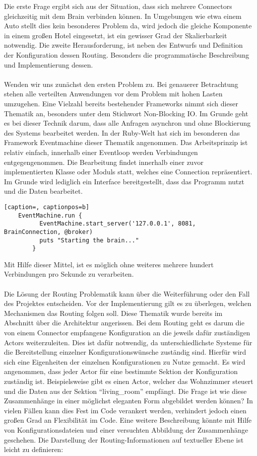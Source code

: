 Die erste Frage ergibt sich aus der Situation, dass sich mehrere Connectors gleichzeitig mit dem Brain verbinden können. In Umgebungen wie etwa einem Auto stellt dies kein besonderes Problem da, wird jedoch die gleiche Komponente in einem großen Hotel eingesetzt, ist ein gewisser Grad der Skalierbarkeit notwendig. Die zweite Herausforderung, ist neben des Entwurfs und Definition der Konfiguration dessen Routing. Besonders die programmatische Beschreibung und Implementierung dessen. 
\\\\
Wenden wir uns zunächst den ersten Problem zu. Bei genauerer Betrachtung stehen alle verteilten Anwendungen vor dem Problem mit hohen Lasten umzugehen. Eine Vielzahl bereits bestehender Frameworks nimmt sich dieser Thematik an, besonders unter dem Stichwort Non-Blocking IO. Im Grunde geht es bei dieser Technik darum, dass alle Anfragen asynchron und ohne Blockierung des Systems bearbeitet werden. In der Ruby-Welt hat sich im besonderen das Framework Eventmachine dieser Thematik angenommen. Das Arbeitsprinzip ist relativ einfach, innerhalb einer Eventloop werden Verbindungen entgegengenommen. Die Bearbeitung findet innerhalb einer zuvor implementierten Klasse oder Moduls statt, welches eine Connection repräsentiert. Im Grunde wird lediglich ein Interface bereitgestellt, dass das Programm nutzt und die Daten bearbeitet. 

\lstset{language=Ruby}
\begin{lstlisting}[caption=, captionpos=b]
	EventMachine.run {
		  EventMachine.start_server('127.0.0.1', 8081, BrainConnection, @broker)
		  puts "Starting the brain..."
		}
\end{lstlisting}

Mit Hilfe dieser Mittel, ist es möglich ohne weiteres mehrere hundert Verbindungen pro Sekunde zu verarbeiten. 
\\\\
Die Lösung der Routing Problematik kann über die Weiterführung oder den Fall des Projektes entscheiden. Vor der Implementierung gilt es zu überlegen, welchen Mechanismen das Routing folgen soll. Diese Thematik wurde bereits im Abschnitt über die Architektur angerissen. Bei dem Routing geht es darum die von einem Connector empfangene Konfiguration an die jeweils dafür zuständigen Actors weiterzuleiten. Dies ist dafür notwendig, da unterschiedlichste Systeme für die Bereitstellung einzelner Konfigurationswünsche zuständig sind. Hierfür wird sich eine Eigenheiten der einzelnen Konfigurationen zu Nutze gemacht. Es wird angenommen, dass jeder Actor für eine bestimmte Sektion der Konfiguration zuständig ist. Beispielsweise gibt es einen Actor, welcher das Wohnzimmer steuert und die Daten aus der Sektion "`living_room"' empfängt. Die Frage ist wie diese Zusammenhänge in einer möglichst eleganten Form abgebildet werden können? 
In vielen Fällen kann dies Fest im Code verankert werden, verhindert jedoch einen großen Grad an Flexibilität im Code. Eine weitere Beschreibung könnte mit Hilfe von Konfigurationsdateien und einer versuchten Abbildung der Zusammenhänge geschehen. Die Darstellung der Routing-Informationen auf textueller Ebene ist leicht zu definieren: 

